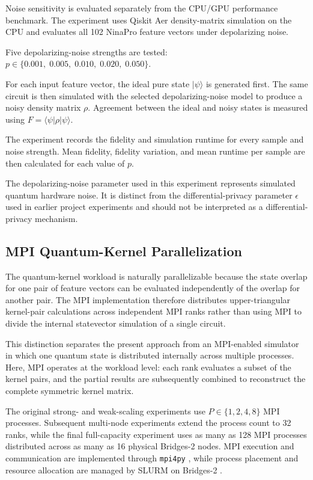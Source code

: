 \documentclass[pdflatex,sn-mathphys-num]{sn-jnl}%
\theoremstyle{thmstyleone}%
\theoremstyle{thmstyletwo}%
\theoremstyle{thmstylethree}%
\begin{document}
Noise sensitivity is evaluated separately from the CPU/GPU performance
benchmark. The experiment uses Qiskit Aer density-matrix simulation on the CPU
and evaluates all 102 NinaPro feature vectors under depolarizing noise.

Five depolarizing-noise strengths are tested: \(p \in \{0.001,\;0.005,\;0.010,\;0.020,\;0.050\}.\)

For each input feature vector, the ideal pure state
$|\psi\rangle$ is generated first. The same circuit is then simulated with the
selected depolarizing-noise model to produce a noisy density matrix $\rho$.
Agreement between the ideal and noisy states is measured using \(F = \langle\psi|\rho|\psi\rangle.\)

The experiment records the fidelity and simulation runtime for every sample and
noise strength. Mean fidelity, fidelity variation, and mean runtime per sample
are then calculated for each value of $p$.

The depolarizing-noise parameter used in this experiment represents simulated
quantum hardware noise. It is distinct from the differential-privacy parameter
$\epsilon$ used in earlier project experiments and should not be interpreted as
a differential-privacy mechanism.


\subsection{MPI Quantum-Kernel Parallelization}
\label{subsec:mpi-method}

The quantum-kernel workload is naturally parallelizable because the state
overlap for one pair of feature vectors can be evaluated independently of the
overlap for another pair. The MPI implementation therefore distributes
upper-triangular kernel-pair calculations across independent MPI ranks rather
than using MPI to divide the internal statevector simulation of a single
circuit.

This distinction separates the present approach from an MPI-enabled simulator
in which one quantum state is distributed internally across multiple processes.
Here, MPI operates at the workload level: each rank evaluates a subset of the
kernel pairs, and the partial results are subsequently combined to reconstruct
the complete symmetric kernel matrix.

The original strong- and weak-scaling experiments use
\(P \in \{1,2,4,8\}\) MPI processes. Subsequent multi-node experiments extend
the process count to 32 ranks, while the final full-capacity experiment uses
as many as 128 MPI processes distributed across as many as 16 physical
Bridges-2 nodes. MPI execution and communication are implemented through
\texttt{mpi4py} \cite{dalcin2021mpi4py}, while process placement and resource
allocation are managed by SLURM on Bridges-2 \cite{bridges2}.
\end{document}

